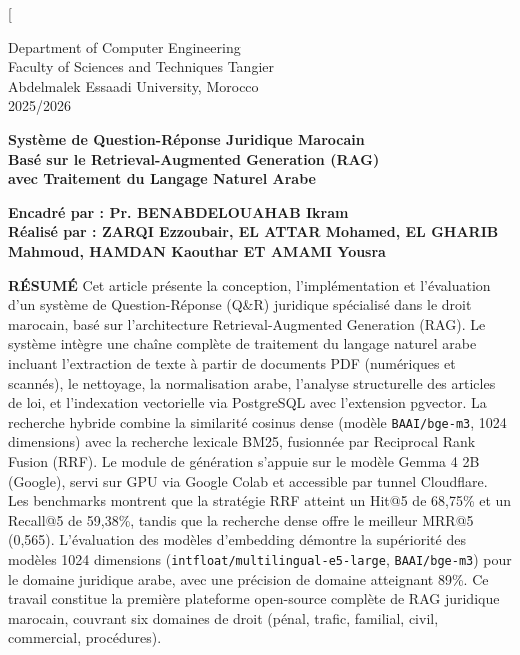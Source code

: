 
\twocolumn[{
\begin{flushleft}

{\small
Department of Computer Engineering\\
Faculty of Sciences and Techniques Tangier\\
Abdelmalek Essaadi University, Morocco\\
2025/2026\par
}

\vspace{2.5em}

{\color{titleblue}\Huge\bfseries
Système de Question-Réponse Juridique Marocain\\[0.2em]
Basé sur le Retrieval-Augmented Generation (RAG)\\[0.2em]
avec Traitement du Langage Naturel Arabe\par
}

\vspace{1.5em}

{\large\bfseries
Encadré par : Pr. BENABDELOUAHAB Ikram\\[0.8em]
Réalisé par : ZARQI Ezzoubair, EL ATTAR Mohamed, EL GHARIB Mahmoud, HAMDAN
Kaouthar ET AMAMI Yousra\par
}


\end{flushleft}

\vspace{1.5em}

\begin{leftbar}
\textbf{\textcolor{headingblue}{RÉSUMÉ}} Cet article présente la conception,
l'implémentation et l'évaluation d'un système de Question-Réponse (Q\&R)
juridique spécialisé dans le droit marocain, basé sur l'architecture
Retrieval-Augmented Generation (RAG). Le système intègre une chaîne complète
de traitement du langage naturel arabe incluant l'extraction de texte à partir
de documents PDF (numériques et scannés), le nettoyage, la normalisation
arabe, l'analyse structurelle des articles de loi, et l'indexation vectorielle
via PostgreSQL avec l'extension pgvector. La recherche hybride combine la
similarité cosinus dense (modèle \texttt{BAAI/bge-m3}, 1024 dimensions) avec
la recherche lexicale BM25, fusionnée par Reciprocal Rank Fusion (RRF).
Le module de génération s'appuie sur le modèle Gemma 4 2B (Google), servi
sur GPU via Google Colab et accessible par tunnel Cloudflare. Les benchmarks
montrent que la stratégie RRF atteint un Hit@5 de 68,75\% et un Recall@5 de
59,38\%, tandis que la recherche dense offre le meilleur MRR@5 (0,565).
L'évaluation des modèles d'embedding démontre la supériorité des modèles
1024 dimensions (\texttt{intfloat/multilingual-e5-large}, \texttt{BAAI/bge-m3})
pour le domaine juridique arabe, avec une précision de domaine atteignant
89\%. Ce travail constitue la première plateforme open-source complète de
RAG juridique marocain, couvrant six domaines de droit (pénal, trafic,
familial, civil, commercial, procédures).
\end{leftbar}

}
